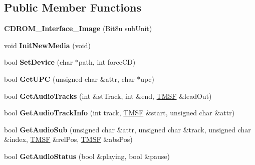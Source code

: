 \subsection*{Public Member Functions}
\begin{DoxyCompactItemize}
\item 
\hypertarget{classCDROM__Interface__Image_acecb6b00f509aba4e203b7bb5c4653fb}{{\bfseries C\-D\-R\-O\-M\-\_\-\-Interface\-\_\-\-Image} (Bit8u sub\-Unit)}\label{classCDROM__Interface__Image_acecb6b00f509aba4e203b7bb5c4653fb}

\item 
\hypertarget{classCDROM__Interface__Image_a8b1323ddfae9e59fae8fa5d8f862c8c4}{void {\bfseries Init\-New\-Media} (void)}\label{classCDROM__Interface__Image_a8b1323ddfae9e59fae8fa5d8f862c8c4}

\item 
\hypertarget{classCDROM__Interface__Image_ae803cb47966de3b637c55c40aaf89e78}{bool {\bfseries Set\-Device} (char $\ast$path, int force\-C\-D)}\label{classCDROM__Interface__Image_ae803cb47966de3b637c55c40aaf89e78}

\item 
\hypertarget{classCDROM__Interface__Image_a0f4704db65cd97e70da4ee7464e535b0}{bool {\bfseries Get\-U\-P\-C} (unsigned char \&attr, char $\ast$upc)}\label{classCDROM__Interface__Image_a0f4704db65cd97e70da4ee7464e535b0}

\item 
\hypertarget{classCDROM__Interface__Image_a4aae5ec2ba0011a4f2281bb312aa49c3}{bool {\bfseries Get\-Audio\-Tracks} (int \&st\-Track, int \&end, \hyperlink{structSMSF}{T\-M\-S\-F} \&lead\-Out)}\label{classCDROM__Interface__Image_a4aae5ec2ba0011a4f2281bb312aa49c3}

\item 
\hypertarget{classCDROM__Interface__Image_a1a1c42c11d483e82f41c6012f5f7d602}{bool {\bfseries Get\-Audio\-Track\-Info} (int track, \hyperlink{structSMSF}{T\-M\-S\-F} \&start, unsigned char \&attr)}\label{classCDROM__Interface__Image_a1a1c42c11d483e82f41c6012f5f7d602}

\item 
\hypertarget{classCDROM__Interface__Image_a11ba4965b5dd42015aff3d9f4b607abc}{bool {\bfseries Get\-Audio\-Sub} (unsigned char \&attr, unsigned char \&track, unsigned char \&index, \hyperlink{structSMSF}{T\-M\-S\-F} \&rel\-Pos, \hyperlink{structSMSF}{T\-M\-S\-F} \&abs\-Pos)}\label{classCDROM__Interface__Image_a11ba4965b5dd42015aff3d9f4b607abc}

\item 
\hypertarget{classCDROM__Interface__Image_a5151e50027294571fafb414d751ca332}{bool {\bfseries Get\-Audio\-Status} (bool \&playing, bool \&pause)}\label{classCDROM__Interface__Image_a5151e50027294571fafb414d751ca332}


\end{DoxyCompactItemize}
